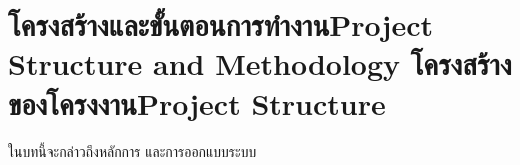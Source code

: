\chapter{\ifproject%
\ifcpe โครงสร้างและขั้นตอนการทำงาน\else Project Structure and Methodology\fi
\else%
\ifcpe โครงสร้างของโครงงาน\else Project Structure\fi
\fi
}

ในบทนี้จะกล่าวถึงหลักการ และการออกแบบระบบ

\makeatletter


\makeatother

